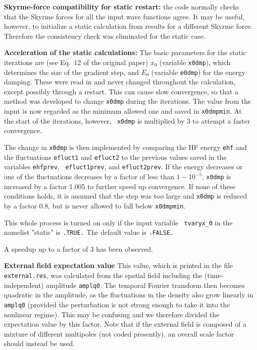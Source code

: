 \documentclass[final,1p,twocolumn]{elsarticle}
\begin{document}
\begin{small}
{\bf Skyrme-force compatibility for static restart:} the code normally
checks that the Skyrme forces for all the input wave functions
agree. It may be useful, however, to initialize a static calculation
from results for a different Skyrme force. Therefore the consistency
check was eliminated for the static case.

{\bf Acceleration of the static calculations:} The basic parameters
for the static iterations are (see Eq.~12 of the original paper) $x_0$
(variable {\tt x0dmp}), which determines the size of the gradient
step, and $E_0$ (variable {\tt e0dmp}) for the energy damping. These
were read in and never changed throughout the calculation, except
possibly through a restart. This can cause slow convergence, so that a
method was developed to change {\tt x0dmp} during the iterations. The
value from the input is now regarded as the minimum allowed one and
saved in {\tt x0dmpmin}. At the start of the iterations, however, {\tt
  x0dmp} is multiplied by 3 to attempt a faster convergence.

The change in {\tt x0dmp} is then implemented by comparing the HF
energy {\tt ehf} and the fluctuations {\tt efluct1} and {\tt efluct2}
to the previous values saved in the variables {\tt ehfprev}, {\tt
  efluct1prev}, and {\tt efluct2prev}. If the energy decreases or one
of the fluctuations decreases by a factor of less than $1-10^{-5}$,
{\tt x0dmp} is increased by a factor 1.005 to further speed up
convergence. If none of these conditions holds, it is assumed that the
step was too large and {\tt x0dmp} is reduced by a factor 0.8, but is
never allowed to fall below {\tt x0dmpmin}.

This whole process is turned on only if the input variable {\tt
  tvaryx\_0} in the namelist "static" is {\tt .TRUE.} The default
value is {\tt .FALSE.}

A speedup up to a factor of 3 has been observed.

{\bf External field expectation value} This value, which is printed in
the file {\tt external.res}, was calculated from the spatial field
including the (time-independent) amplitude {\tt amplq0}. The temporal
Fourier transform then becomes quadratic in the amplitude, as the
fluctuations in the density also grow linearly in {\tt amplq0}
(provided the perturbation is not strong enough to take it into the
nonlinear regime).  This may be confusing and we therefore divided the
expectation value by this factor.  Note that if the external field is
composed of a mixture of different multipoles (not coded presently),
an overall scale factor should instead be used.


\end{small}
\end{document}
